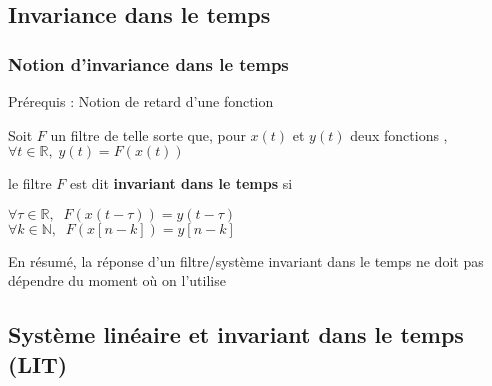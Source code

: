 \documentclass{beamer}
\begin{document}
\subsection{Invariance dans le temps}
\begin{frame}
\frametitle{Notion d'invariance dans le temps}
Prérequis : Notion de retard d'une fonction \\

\end{frame}



\begin{frame}
Soit $F$ un filtre de telle sorte que, pour $x(t)$ et $y(t)$ deux fonctions , $ \forall t \in \mathbb{R}, \; y(t) = F(x(t))$ \\

{
\vspace{1cm} 
le filtre $F$  est dit \textbf{invariant dans le temps} si \\
\vspace{1cm}
\begin{center}
$\forall \tau \in \mathbb{R}, \;\; F(x(t-\tau)) = y(t-\tau)$\\
\vspace{0.7 cm}
$\forall k \in \mathbb{N}, \;\; F(x[n-k]) = y[n-k]$\\
\end{center}
}

{ 
\begin{block}{}
	En résumé, la réponse d'un filtre/système invariant dans le temps ne doit pas dépendre du moment où on l'utilise
\end{block} 
}

\end{frame}

\subsection{Système linéaire et invariant dans le  temps (LIT)}
\end{document}
